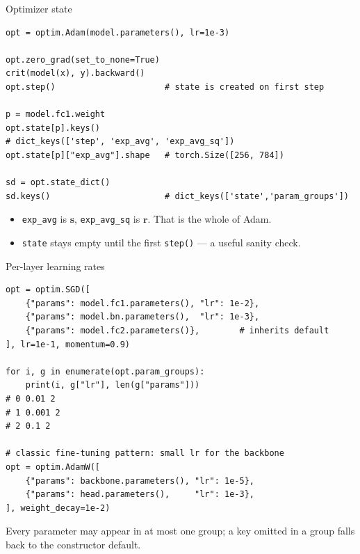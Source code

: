 \documentclass[10pt,aspectratio=169]{beamer}
\begin{document}
\begin{frame}[fragile]{Optimizer state}
\begin{lstlisting}
opt = optim.Adam(model.parameters(), lr=1e-3)

opt.zero_grad(set_to_none=True)
crit(model(x), y).backward()
opt.step()                      # state is created on first step

p = model.fc1.weight
opt.state[p].keys()
# dict_keys(['step', 'exp_avg', 'exp_avg_sq'])
opt.state[p]["exp_avg"].shape   # torch.Size([256, 784])

sd = opt.state_dict()
sd.keys()                       # dict_keys(['state','param_groups'])
\end{lstlisting}
\begin{itemize}
    \item \texttt{exp\_avg} is $\mathbf{s}$, \texttt{exp\_avg\_sq} is $\mathbf{r}$. That is the whole of Adam.
    \item \texttt{state} stays empty until the first \texttt{step()} --- a useful sanity check.
\end{itemize}
\end{frame}

\begin{frame}[fragile]{Per-layer learning rates}
\begin{lstlisting}
opt = optim.SGD([
    {"params": model.fc1.parameters(), "lr": 1e-2},
    {"params": model.bn.parameters(),  "lr": 1e-3},
    {"params": model.fc2.parameters()},        # inherits default
], lr=1e-1, momentum=0.9)

for i, g in enumerate(opt.param_groups):
    print(i, g["lr"], len(g["params"]))
# 0 0.01 2
# 1 0.001 2
# 2 0.1 2

# classic fine-tuning pattern: small lr for the backbone
opt = optim.AdamW([
    {"params": backbone.parameters(), "lr": 1e-5},
    {"params": head.parameters(),     "lr": 1e-3},
], weight_decay=1e-2)
\end{lstlisting}
Every parameter may appear in at most one group; a key omitted in a group falls back to the
constructor default.
\end{frame}
\end{document}
